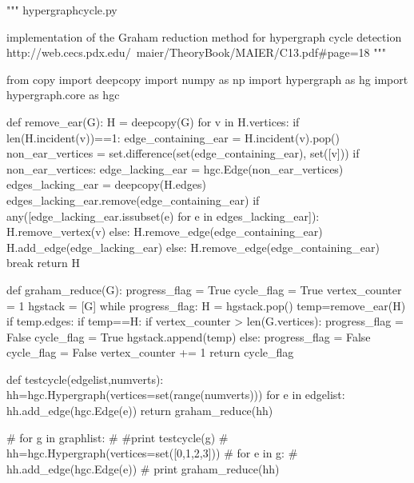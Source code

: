 \begin{python}
"""
hypergraphcycle.py

implementation of the Graham reduction method
for hypergraph cycle detection
http://web.cecs.pdx.edu/~maier/TheoryBook/MAIER/C13.pdf#page=18
"""

from copy import deepcopy
import numpy as np
import hypergraph as hg
import hypergraph.core as hgc

def remove_ear(G):
    H = deepcopy(G)
    for v in H.vertices:
        if len(H.incident(v))==1:
            edge_containing_ear = H.incident(v).pop()
            non_ear_vertices = set.difference(set(edge_containing_ear),
                                              set([v]))
            if non_ear_vertices:
                edge_lacking_ear = hgc.Edge(non_ear_vertices)
                edges_lacking_ear = deepcopy(H.edges)
                edges_lacking_ear.remove(edge_containing_ear)
                if any([edge_lacking_ear.issubset(e) for e in edges_lacking_ear]):
                    H.remove_vertex(v)
                else:
                    H.remove_edge(edge_containing_ear)
                    H.add_edge(edge_lacking_ear)
            else:
                H.remove_edge(edge_containing_ear)
            break
    return H

def graham_reduce(G):
    progress_flag = True
    cycle_flag = True
    vertex_counter = 1
    hgstack = [G]
    while progress_flag:
        H = hgstack.pop()
        temp=remove_ear(H)
        if temp.edges:
            if temp==H:
                if vertex_counter > len(G.vertices):
                    progress_flag = False
                    cycle_flag = True
            hgstack.append(temp)
        else:
            progress_flag = False
            cycle_flag = False
        vertex_counter += 1
    return cycle_flag

def testcycle(edgelist,numverts):
    hh=hgc.Hypergraph(vertices=set(range(numverts)))
    for e in edgelist:
        hh.add_edge(hgc.Edge(e))
    return graham_reduce(hh)


# for g in graphlist:
#     #print testcycle(g)
#     hh=hgc.Hypergraph(vertices=set([0,1,2,3]))
#     for e in g:
#         hh.add_edge(hgc.Edge(e))
#     print graham_reduce(hh)
\end{python}
